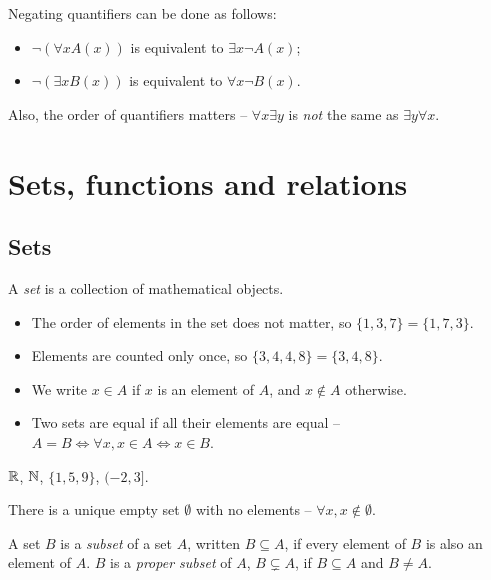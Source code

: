 \documentclass{../template/note}
\begin{document}
    Negating quantifiers can be done as follows:
    \begin{itemize}
        \item \(\neg (\forall x A(x))\) is equivalent to \(\exists x \neg A(x)\);
        \item \(\neg (\exists x B(x))\) is equivalent to \(\forall x \neg B(x)\).
    \end{itemize}
    
    Also, the order of quantifiers matters -- \(\forall x \exists y\) is \emph{not} the same as \(\exists y \forall x\).

    \section{Sets, functions and relations}

    \subsection{Sets}

    \begin{definition}
        A \emph{set} is a collection of mathematical objects.
        \begin{itemize}
            \item The order of elements in the set does not matter, so \(\{1, 3, 7\} = \{1, 7, 3\}\).
            \item Elements are counted only once, so \(\{3, 4, 4, 8\} = \{3, 4, 8\}\).
            \item We write \(x \in A\) if \(x\) is an element of \(A\), and \(x \notin A\) otherwise.
            \item Two sets are equal if all their elements are equal -- \(A = B \iff \forall x, x \in A \iff x \in B\).
        \end{itemize}
    \end{definition}

    \begin{example*}
        \(\mathbb R\), \(\mathbb N\), \(\{1, 5, 9\}\), \((-2, 3]\).
    \end{example*}
    
    There is a unique empty set \(\emptyset\) with no elements -- \(\forall x, x \notin \emptyset\).

    \begin{definition}
        A set \(B\) is a \emph{subset} of a set \(A\), written \(B \subseteq A\), if every element of \(B\) is also an element of \(A\). \(B\) is a \emph{proper subset} of \(A\), \(B \subsetneq A\), if \(B \subseteq A\) and \(B \neq A\).
    \end{definition}
    
\end{document}
